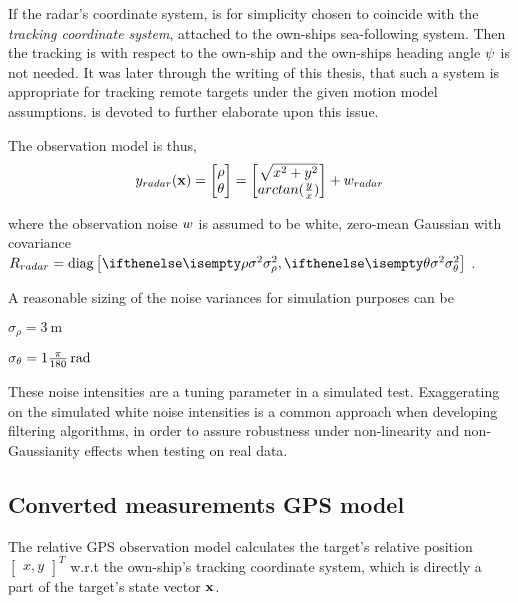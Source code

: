If the radar's coordinate system, is for simplicity  chosen to coincide with the \emph{tracking coordinate system},  attached to the own-ships sea-following system. Then the tracking is with respect to the own-ship and the own-ships heading angle ${\psi}$ is not needed. It was later through the writing of this thesis, that such a system is appropriate for tracking remote targets under the given motion model assumptions.  is devoted to further elaborate upon this issue.

The observation model is thus,
\begin{equation}
{{y}}_{radar}(\mathbf{x}) = \begin{bmatrix}
\rho \\
\theta
\end{bmatrix} = \begin{bmatrix}
\sqrt{x^2 + y^2} \\
arctan(\frac{y}{x})
\end{bmatrix} + {w}_{radar}
\end{equation}


where the observation noise ${w}$ is assumed to be white, zero-mean Gaussian with covariance $\measCov_{radar} = \text{diag}\left[\variance{\rho}, \variance{\theta}\right] $ .



A reasonable sizing of the noise variances for simulation purposes can be
\begin{description}
	\item $\sigma_\rho = \SI{3}{\meter}$
	\item $\sigma_\theta = \SI[parse-numbers=false]{1\frac{\pi}{180}}{\radian}  $
\end{description}

These noise intensities are a tuning parameter in a simulated test. Exaggerating on the simulated white noise intensities is a common approach when developing filtering algorithms, in order to assure robustness under non-linearity and non-Gaussianity effects when testing on real data.

\subsection{Converted measurements GPS model}


The relative GPS observation model calculates the target's relative position $\begin{bmatrix}x, y\end{bmatrix}^{T} $ w.r.t the own-ship's tracking coordinate system, which is directly a part of the target's state vector $\mathbf{x}$. 

